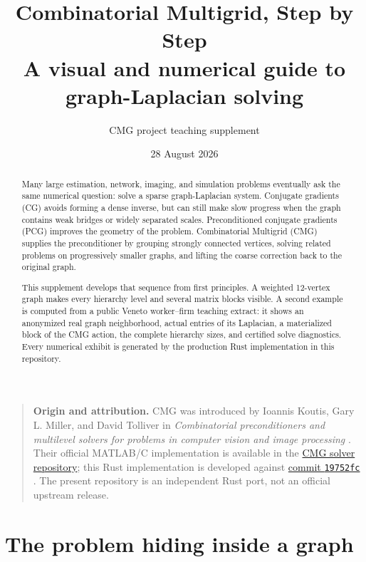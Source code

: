 \documentclass[11pt]{article}
\title{\textcolor{cmgnavy}{\Huge Combinatorial Multigrid, Step by Step}\\[0.6em]
\Large A visual and numerical guide to graph-Laplacian solving}
\author{CMG project teaching supplement}
\date{28 August 2026}
\newcommand{\code}[1]{\texttt{#1}}
\begin{document}
\maketitle

\begin{abstract}
Many large estimation, network, imaging, and simulation problems eventually ask the same numerical question: solve a sparse graph-Laplacian system.  Conjugate gradients (CG) avoids forming a dense inverse, but can still make slow progress when the graph contains weak bridges or widely separated scales.  Preconditioned conjugate gradients (PCG) improves the geometry of the problem.  Combinatorial Multigrid (CMG) supplies the preconditioner by grouping strongly connected vertices, solving related problems on progressively smaller graphs, and lifting the coarse correction back to the original graph.

This supplement develops that sequence from first principles.  A weighted 12-vertex graph makes every hierarchy level and several matrix blocks visible.  A second example is computed from a public Veneto worker--firm teaching extract: it shows an anonymized real graph neighborhood, actual entries of its Laplacian, a materialized block of the CMG action, the complete hierarchy sizes, and certified solve diagnostics.  Every numerical exhibit is generated by the production Rust implementation in this repository.
\end{abstract}

\begin{quote}
\textbf{Origin and attribution.} CMG was introduced by Ioannis Koutis, Gary L. Miller, and David Tolliver in \emph{Combinatorial preconditioners and multilevel solvers for problems in computer vision and image processing} \citep{KoutisMillerTolliver2011}.  Their official MATLAB/C implementation is available in the \href{https://github.com/ikoutis/cmg-solver}{CMG solver repository}; this Rust implementation is developed against \href{https://github.com/ikoutis/cmg-solver/tree/19752fc102f8cae8e34f66457bfaccb1aaa60375}{commit \code{19752fc}} \citep{CmgSolverUpstream}.  The present repository is an independent Rust port, not an official upstream release.
\end{quote}

\tableofcontents
\listoffigures
\clearpage

\section{The problem hiding inside a graph}
\end{document}
